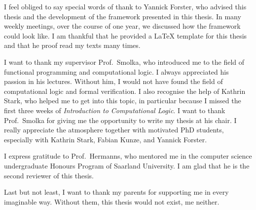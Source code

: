 I feel obliged to say special words of thank to Yannick Forster, who advised this thesis and the development of the framework presented in this
thesis.  In many weekly meetings, over the course of one year, we discussed how the framework could look like.  I am thankful that he provided a
{\LaTeX} template for this thesis and that he proof read my texts many times.

I want to thank my supervisor Prof.~Smolka, who introduced me to the field of functional programming and computational logic.  I always appreciated
his passion in his lectures.  Without him, I would not have found the field of computational logic and formal verification.  I also recognise the help
of Kathrin Stark, who helped me to get into this topic, in particular because I missed the first three weeks of \textit{Introduction to Computational
  Logic}.  I want to thank Prof.~Smolka for giving me the opportunity to write my thesis at his chair.  I really appreciate the atmosphere together
with motivated PhD students, especially with Kathrin Stark, Fabian Kunze, and Yannick Forster.

I express gratitude to Prof.~Hermanns, who mentored me in the computer science undergraduate Honours Program of Saarland University.  I am glad that
he is the second reviewer of this thesis.

Last but not least, I want to thank my parents for supporting me in every imaginable way.  Without them, this thesis would not exist, me neither.


